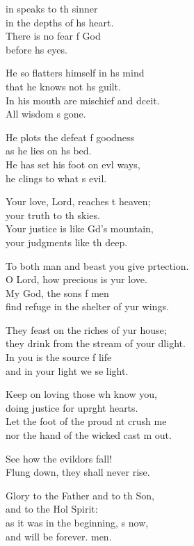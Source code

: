\begin{psalmverse}
  \begin{patverse}
    in speaks to th sinner\Med\\
in the depths of h\pointup{\i}s heart.\\
There is no fear f God\Med\\
before h\pointup{\i}s eyes.

He so flatters himself in h\pointup{\i}s mind\Med\\
that he knows not h\pointup{\i}s guilt.\\
In his mouth are mischief and dceit.\Med\\
All wisdom \pointup{\i}s gone.

He plots the defeat f goodness\Med\\
as he lies on h\pointup{\i}s bed.\\
He has set his foot on ev\pointup{\i}l ways,\Med\\
he clings to what \pointup{\i}s evil.

Your love, Lord, reaches t heaven;\Med\\
your truth to th skies.\\
Your justice is like Gd’s mountain,\Med\\
your judgments like th deep.

To both man and beast you give prtection.\Med\\
O Lord, how precious is yur love.\\
My God, the sons f men\Med\\
find refuge in the shelter of yur wings.

They feast on the riches of yur house;\Med\\
they drink from the stream of your dlight.\\
In you is the source f life\Med\\
and in your light we se light.

Keep on loving those wh know you,\Med\\
doing justice for upr\pointup{\i}ght hearts.\\
Let the foot of the proud nt crush me\Med\\
nor the hand of the wicked cast m out.

See how the evildors fall!\Med\\
Flung down, they shall never rise.

Glory to the Father and to th Son,\Med\\
and to the Hol Spirit:\\
as it was in the beginning, \pointup{\i}s now,\Med\\
and will be forever. men. 
  \end{patverse}
\end{psalmverse}
